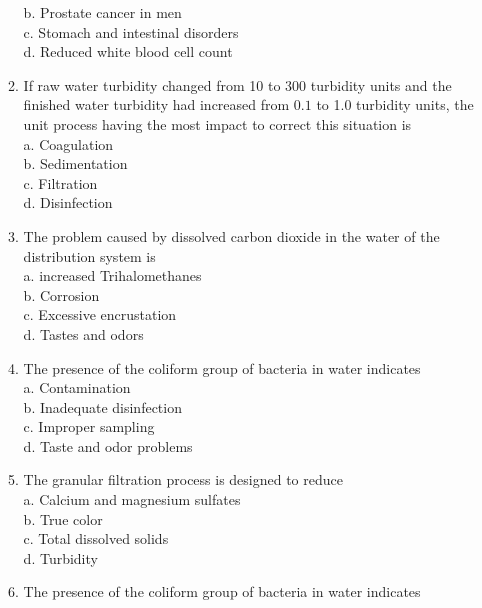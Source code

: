 \documentclass[10pt]{article}
\begin{document}
\begin{enumerate}
\begin{enumerate}
b. Prostate cancer in men\\

c. Stomach and intestinal disorders\\

d. Reduced white blood cell count\\

  \item If raw water turbidity changed from 10 to 300 turbidity units and the finished water turbidity had increased from $0.1$ to 1.0 turbidity units, the unit process having the most impact to correct this situation is\\
a. Coagulation\\
b. Sedimentation\\
c. Filtration\\
d. Disinfection\\

\item The problem caused by dissolved carbon dioxide in the water of the distribution system is\\
a. increased Trihalomethanes\\
b. Corrosion\\
c. Excessive encrustation\\
d. Tastes and odors\\

\item The presence of the coliform group of bacteria in water indicates\\

a. Contamination\\

b. Inadequate disinfection\\

c. Improper sampling\\

d. Taste and odor problems\\


  \item The granular filtration process is designed to reduce\\
a. Calcium and magnesium sulfates\\

b. True color\\

c. Total dissolved solids\\

d. Turbidity\\


\item The presence of the coliform group of bacteria in water indicates\\


\end{enumerate}
\end{enumerate}
\end{document}
